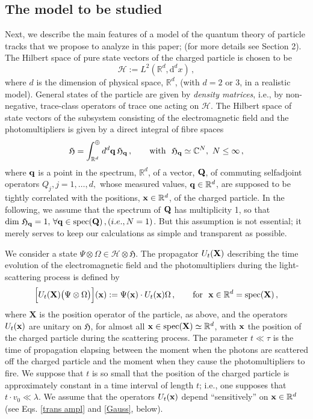 \documentclass[12pt]{article}
\renewcommand{\d}{{\mathrm d}}
\begin{document}
\subsection{The model to be studied}\label{mod}
Next, we describe the main features of a model of the quantum theory of particle tracks that we propose to analyze in this paper; (for more details see Section 2). The Hilbert space of pure state vectors of the charged particle is chosen to be
\begin{equation}\label{Hilbert}
\mathcal{H}:= L^{2}(\mathbb{R}^{d}, \d^{d}x)\,,
\end{equation}
where $d$ is the dimension of physical space, $\mathbb{R}^{d}$, (with $d=2$ or $3$, in a realistic model).
General states of the particle are given by \textit{density matrices}, i.e., by non-negative, trace-class 
operators of trace one acting on $\mathcal{H}$. The Hilbert space of state vectors of the subsystem consisting of the electromagnetic field and the photomultipliers is given by a direct integral of fibre spaces 
$$\mathfrak{H} = \int^{\oplus}_{\mathbb{R}^{d}} d^{d}{\bf{q}}\, \mathfrak{H}_{{\bf{q}}}\,, \qquad \text{with  }\,\, 
\mathfrak{H}_{{\bf{q}}} \simeq \mathbb{C}^{N}, \, \, N\leq \infty\,,$$ 
where ${\bf{q}}$ is a point in the spectrum, $\mathbb{R}^{d}$, of a vector, ${\bf{Q}}$, of commuting selfadjoint operators $Q_{j}, j=1,\dots,d,$ whose measured values, ${\bf{q}} \in \mathbb{R}^{d}$, are supposed to be tightly correlated 
with the positions, ${\bf{x}} \in \mathbb{R}^{d}$, of the charged particle. In the following, we assume that the spectrum of 
${\bf{Q}}$ has multiplicity 1, so that $\text{dim } \mathfrak{H}_{{\bf{q}}} = 1, \, \forall {\bf{q}} \in \text{spec}({\bf{Q}})\,, (i.e., 
N=1)$. But this assumption is not essential; it merely serves to keep our calculations as simple and transparent as possible.

We consider a state 
$\Psi \otimes \Omega \in \mathcal{H}\otimes \mathfrak{H}$. The propagator $U_{t}({\bf{X}})$ describing the time evolution of the electromagnetic field and the photomultipliers during the light-scattering process is defined by
\begin{equation}\label{prop}
\Big[U_{t}({\bf{X}}) \big( \Psi \otimes \Omega \big)\Big]({\bf{x}}):= \Psi({\bf{x}})\cdot U_{t}({\bf{x}})\Omega\,, \qquad \text{for  }\,\, {\bf{x}}\in \mathbb{R}^{d}= \text{spec}({\bf{X}})\,,
\end{equation}
where $\mathbf{X}$ is the position operator of the particle, as above, and the operators $U_{t}({\bf{x}})$ 
are unitary on $\mathfrak{H}$, for almost all ${\bf{x}}\in \text{spec}(\mathbf{X}) \simeq \mathbb{R}^{d}$, 
with ${\bf{x}}$ the position of the charged particle during the scattering process. 
The parameter $t\ll \tau$ is the time of propagation elapsing between the moment when the photons are scattered 
off the charged particle and the moment when they cause the photomultipliers to fire. We suppose that $t$ is so small 
that the position of the charged particle is approximately constant in a time interval of length $t$; i.e., one supposes that 
$t\cdot v_0 \ll \lambda$. We assume that the operators $U_{t}({\bf{x}})$ depend ``sensitively'' on ${\bf{x}} \in \mathbb{R}^{d}$ (see Eqs. \eqref{trans ampl} and \eqref{Gauss}, below).
\end{document}
